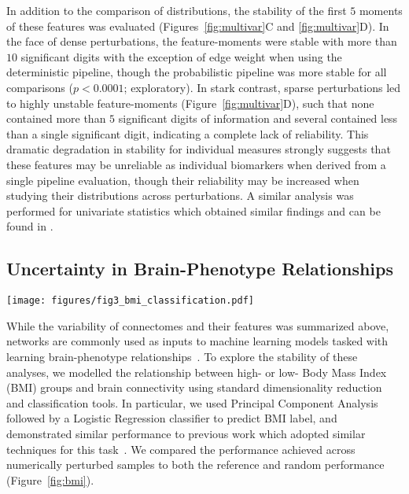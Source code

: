\documentclass[fleqn,10pt]{SelfArx} %
\newcommand{\new}[1]{{#1}}
\newcommand{\newtwo}[1]{{\color{blue}#1\color{black}}}
\begin{document}
In addition to the comparison of distributions, the stability of the first $5$ moments of these features was evaluated
(Figures~\ref{fig:multivar}C and \ref{fig:multivar}D). In the face of \new{dense} perturbations, the feature-moments
were stable with more than $10$ significant digits with the exception of edge weight when using the deterministic
pipeline, though the probabilistic pipeline was more stable for all comparisons ($p < 0.0001$; exploratory). In stark
contrast, \new{sparse} perturbations led to highly unstable feature-moments (Figure~\ref{fig:multivar}D), such that
none contained more than $5$ significant digits of information and several contained less than a single significant
digit, indicating a complete lack of reliability. This dramatic degradation in stability for individual measures
strongly suggests that these features may be unreliable as individual biomarkers when derived from a single pipeline
evaluation, though their reliability may be increased when studying their distributions across perturbations. A similar
analysis was performed for univariate statistics \new{which obtained similar findings} and can be found in
.

\subsection*{Uncertainty in Brain-Phenotype Relationships}

\begin{figure*}[ht]\centering
\texttt{[image: figures/fig3\_bmi\_classification.pdf]}
\caption{Variability in BMI classification across the sampling of an MCA-perturbed dataset. The dashed red lines
indicate random-chance performance, and the orange dots show the performance using the reference executions.}
\label{fig:bmi}
\end{figure*}
 
While the variability of connectomes and their features was summarized above, networks are commonly used as inputs to
machine learning models tasked with learning brain-phenotype relationships~\cite{Dubois2016-yr}. To explore the
stability of these analyses, we modelled the relationship between high- or low- Body Mass Index (BMI) groups and brain
connectivity using standard dimensionality reduction and classification tools. \newtwo{In particular, we used Principal
Component Analysis followed by a Logistic Regression classifier to predict BMI label, and demonstrated similar performance
to previous work which adopted similar techniques for this task~\cite{Park2015-uj,Gupta2015-ap}. We}
compared \newtwo{the performance achieved across numerically perturbed samples to both the} reference and random
performance (Figure~\ref{fig:bmi}).
\end{document}
